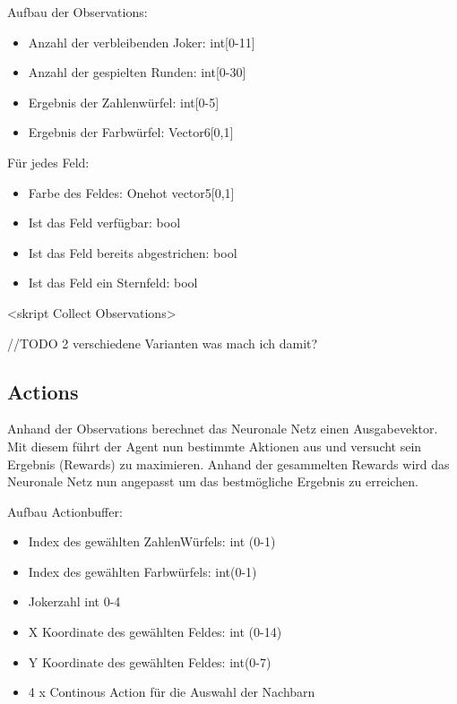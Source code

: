 Aufbau der Observations:
\begin{itemize}
\item Anzahl der verbleibenden Joker: int[0-11]
\item Anzahl der gespielten Runden: int[0-30]
\item Ergebnis der Zahlenwürfel: int[0-5]
\item Ergebnis der Farbwürfel: Vector6[0,1]
\end{itemize}

Für jedes Feld:
\begin{itemize}\subsection{Bewertungsmetriken für RL-Agenten}
\item Farbe des Feldes: Onehot vector5[0,1]
\item Ist das Feld verfügbar: bool
\item Ist das Feld bereits abgestrichen: bool
\item Ist das Feld ein Sternfeld:  bool
\end{itemize}

<skript Collect Observations>

//TODO 2 verschiedene Varianten was mach ich damit?

\subsection{Actions}
Anhand der Observations berechnet das Neuronale Netz einen Ausgabevektor. Mit diesem führt der Agent nun bestimmte Aktionen aus und versucht sein Ergebnis (Rewards) zu maximieren.
Anhand der gesammelten Rewards wird das Neuronale Netz nun angepasst um das bestmögliche Ergebnis zu erreichen.


Aufbau Actionbuffer:
\begin{itemize}
\item Index des gewählten ZahlenWürfels: int (0-1)
\item Index des gewählten Farbwürfels: int(0-1)
\item Jokerzahl int 0-4
\item X Koordinate des gewählten Feldes: int (0-14)
\item Y Koordinate des gewählten Feldes: int(0-7)
\item 4 x Continous Action für die Auswahl der Nachbarn
\end{itemize}

